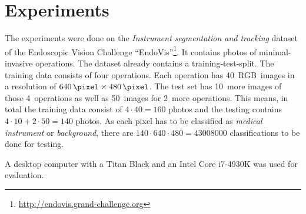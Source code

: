 
\section{Experiments}\label{sec:experiments}

The experiments were done on the \textit{Instrument segmentation and tracking}
dataset of the Endoscopic Vision Challenge
\enquote{EndoVis}\footnote{\href{http://endovis.grand-challenge.org/}{http://endovis.grand-challenge.org}}.
It contains photos of minimal-invasive operations. The dataset already contains
a training-test-split. The training data consists of four operations. Each
operation has 40~RGB~images in a resolution of $\SI{640}{\pixel} \times
\SI{480}{\pixel}$. The test set has 10~more images of those 4~operations as
well as 50~images for 2~more operations. This means, in total the training data
consist of $4 \cdot 40 = 160$ photos and the testing contains $4 \cdot 10 + 2
\cdot 50 = 140$ photos. As each pixel has to be classified as \textit{medical
instrument} or \textit{background}, there are
$140 \cdot 640 \cdot 480 = \num{43008000}$ classifications to be done for
testing.

A desktop computer with a Titan Black and an Intel Core i7-4930K was used for
evaluation.




